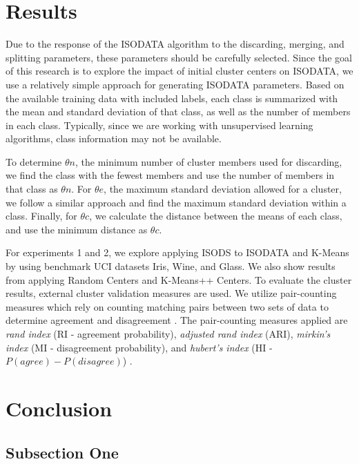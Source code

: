 \documentclass[twoside,twocolumn]{article}
\begin{document}
\section{Results}

Due to the response of the ISODATA algorithm to the discarding, merging, and
splitting parameters, these parameters should be carefully selected. Since the
goal of this research is to explore the impact of initial cluster centers on
ISODATA, we use a relatively simple approach for generating ISODATA parameters.
Based on the available training data with included labels, each class is
summarized with the mean and standard deviation of that class, as well as the
number of members in each class. Typically, since we are working with
unsupervised learning algorithms, class information may not be available.

To determine $\theta n$, the minimum number of cluster members used for
discarding, we find the class with the fewest members and use the number of
members in that class as $\theta n$. For $\theta e$, the maximum standard
deviation allowed for a cluster, we follow a similar approach and find the
maximum standard deviation within a class. Finally, for $\theta c$, we calculate
the distance between the means of each class, and use the minimum distance as
$\theta c$.

For experiments 1 and 2, we explore applying ISODS to ISODATA and K-Means by
using benchmark UCI datasets Iris, Wine, and Glass. We also show results from
applying Random Centers and K-Means++ Centers. To evaluate the cluster results,
external cluster validation measures are used. We utilize pair-counting measures
which rely on counting matching pairs between two sets of data to determine
agreement and disagreement \cite{Rezaei2016}. The pair-counting measures applied
are \textit{rand index} (RI - agreement probability), \textit{adjusted rand
  index} (ARI), \textit{mirkin's index} (MI - disagreement probability), and
\textit{hubert's index} (HI - $P(agree) - P(disagree)$)\cite{Hubert1985}
\cite{Meila2003}.



\section{Conclusion}

\subsection{Subsection One}
\end{document}
